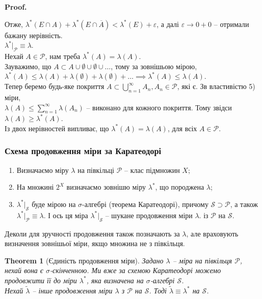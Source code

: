 \documentclass[a4paper, 10pt]{article}
\makeatletter
\theoremstyle{theoremdd}
\newtheorem{theorem}{Theorem}[subsection]
\renewenvironment{proof}[1][Proof.\\]{\par
\pushQED{\hfill \qed}%
\normalfont \topsep6\p@\@plus6\p@\relax
\trivlist
\item\relax
{\bfseries
#1\@addpunct{.}}\hspace\labelsep\ignorespaces
}{%
\popQED\endtrivlist\@endpefalse
}
\makeatother
\begin{document}
\begin{proof}
Отже, $\lambda^*(E \cap A) + \lambda^*(E \cap \overline{A}) < \lambda^*(E) + \varepsilon$, а далі $\varepsilon \to 0+0$ -- отримали бажану нерівність.
\bigskip \\
$\lambda^*|_\mathcal{P} \equiv \lambda$.\\
Нехай $A \in \mathcal{P}$, нам треба $\lambda^*(A) = \lambda(A)$.\\
Зауважимо, що $A \subset A \cup \emptyset \cup \emptyset \cup \dots$, тому за зовнішьою мірою, $\lambda^*(A) \leq \lambda(A) + \lambda(\emptyset) + \lambda(\emptyset) + \dots \implies \lambda^*(A) \leq \lambda(A)$.\\
Тепер беремо будь-яке покриття $A \subset \displaystyle\bigcup_{n=1}^\infty A_n, A_n \in \mathcal{P}$, які є. Зв властивістю 5) міри,\\
$\lambda(A) \leq \displaystyle\sum_{n=1}^\infty \lambda(A_n)$ -- виконано для кожного покриття. Тому звідси $\lambda(A) \geq \lambda^*(A)$.\\
Із двох нерівностей випливає, що $\lambda^*(A) = \lambda(A)$, для всіх $A \in \mathcal{P}$.
\end{proof}

\subsubsection*{Схема продовження міри за Каратеодорі}
\begin{enumerate}[nosep,wide=0pt,label={\arabic*)}]
\item Визначаємо міру $\lambda$ на півкільці $\mathcal{P}$ -- клас підмножин $X$;
\item На множині $2^X$ визначаємо зовнішю міру $\lambda^*$, що породжена $\lambda$;
\item $\lambda^*|_{\mathcal{S}}$ буде мірою на $\sigma$-алгебрі (теорема Каратеодорі), причому $\mathcal{S} \supset \mathcal{P}$, а також $\lambda^*|_{\mathcal{P}} \equiv \lambda$. І ось ця міра $\lambda^*|_{\mathcal{S}}$ -- шукане продовження міри $\lambda$. із $\mathcal{P}$ на $\mathcal{S}$.\\ \end{enumerate}
\noindent
Деколи для зручності продовження також позначають за $\lambda$, але враховують визначення зовнішьої міри, якщо множина не з півкільця.

\begin{theorem}[Єдиність продовження міри]
Задано $\lambda$ -- міра на півкільця $\mathcal{P}$, нехай вона є $\sigma$-скінченною. Ми вже за схемою Каратеодорі можемо продовжити її до міри $\lambda^*$, яка визначена на $\sigma$-алгебрі $\mathcal{S}$.\\
Нехай $\tilde{\lambda}$ -- інше продовження міри $\lambda$ з $\mathcal{P}$ на $\mathcal{S}$. Тоді $\tilde{\lambda} \equiv \lambda^*$ на $\mathcal{S}$.
\end{theorem}
\end{document}
